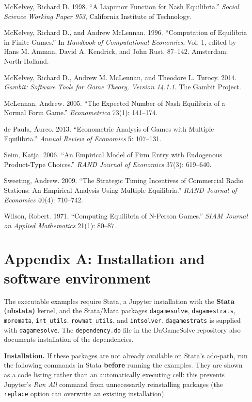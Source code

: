\documentclass[11pt]{article}
\begin{document}
McKelvey, Richard D. 1998. ``A Liapunov Function for Nash Equilibria.''
\emph{Social Science Working Paper 953}, California Institute of
Technology.

McKelvey, Richard D., and Andrew McLennan. 1996. ``Computation of
Equilibria in Finite Games.'' In \emph{Handbook of Computational
Economics}, Vol. 1, edited by Hans M. Amman, David A. Kendrick, and John
Rust, 87--142. Amsterdam: North-Holland.

McKelvey, Richard D., Andrew M. McLennan, and Theodore L. Turocy. 2014.
\emph{Gambit: Software Tools for Game Theory, Version 14.1.1.} The
Gambit Project.

McLennan, Andrew. 2005. ``The Expected Number of Nash Equilibria of a
Normal Form Game.'' \emph{Econometrica} 73(1): 141--174.

de Paula, Áureo. 2013. ``Econometric Analysis of Games with Multiple
Equilibria.'' \emph{Annual Review of Economics} 5: 107--131.

Seim, Katja. 2006. ``An Empirical Model of Firm Entry with Endogenous
Product-Type Choices.'' \emph{RAND Journal of Economics} 37(3):
619--640.

Sweeting, Andrew. 2009. ``The Strategic Timing Incentives of Commercial
Radio Stations: An Empirical Analysis Using Multiple Equilibria.''
\emph{RAND Journal of Economics} 40(4): 710--742.

Wilson, Robert. 1971. ``Computing Equilibria of N-Person Games.''
\emph{SIAM Journal on Applied Mathematics} 21(1): 80--87.

    \section*{Appendix A: Installation and software
environment}\label{appendix-a-installation-and-software-environment}

The executable examples require Stata, a Jupyter installation with the
\textbf{Stata (nbstata)} kernel, and the Stata/Mata packages
\texttt{dagamesolve}, \texttt{dagamestrats}, \texttt{moremata},
\texttt{int\_utils}, \texttt{rowmat\_utils}, and \texttt{intsolver}.
\texttt{dagamestrats} is supplied with \texttt{dagamesolve}. The
\texttt{dependency.do} file in the DaGameSolve repository also documents
installation of the dependencies.

\textbf{Installation.} If these packages are not already available on
Stata's ado-path, run the following commands in Stata \textbf{before}
running the examples. They are shown as a code listing rather than an
automatically executing cell: this prevents Jupyter's \emph{Run All}
command from unnecessarily reinstalling packages (the \texttt{replace}
option can overwrite an existing installation).
\end{document}
